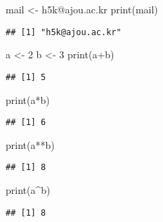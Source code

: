 \documentclass[
]{article}
\newenvironment{Shaded}{\begin{snugshade}}{\end{snugshade}}
\newcommand{\DecValTok}[1]{\textcolor[rgb]{0.00,0.00,0.81}{#1}}
\newcommand{\FunctionTok}[1]{\textcolor[rgb]{0.00,0.00,0.00}{#1}}
\newcommand{\NormalTok}[1]{#1}
\newcommand{\OtherTok}[1]{\textcolor[rgb]{0.56,0.35,0.01}{#1}}
\newcommand{\SpecialCharTok}[1]{\textcolor[rgb]{0.00,0.00,0.00}{#1}}
\newcommand{\StringTok}[1]{\textcolor[rgb]{0.31,0.60,0.02}{#1}}
\begin{document}
\begin{Shaded}
\begin{Highlighting}[]
\NormalTok{mail }\OtherTok{\textless{}{-}} \StringTok{\textquotesingle{}h5k@ajou.ac.kr\textquotesingle{}}
\FunctionTok{print}\NormalTok{(mail)}
\end{Highlighting}
\end{Shaded}

\begin{verbatim}
## [1] "h5k@ajou.ac.kr"
\end{verbatim}

\begin{Shaded}
\begin{Highlighting}[]
\NormalTok{a }\OtherTok{\textless{}{-}} \DecValTok{2}
\NormalTok{b }\OtherTok{\textless{}{-}} \DecValTok{3}
\FunctionTok{print}\NormalTok{(a}\SpecialCharTok{+}\NormalTok{b)}
\end{Highlighting}
\end{Shaded}

\begin{verbatim}
## [1] 5
\end{verbatim}

\begin{Shaded}
\begin{Highlighting}[]
\FunctionTok{print}\NormalTok{(a}\SpecialCharTok{*}\NormalTok{b)}
\end{Highlighting}
\end{Shaded}

\begin{verbatim}
## [1] 6
\end{verbatim}

\begin{Shaded}
\begin{Highlighting}[]
\FunctionTok{print}\NormalTok{(a}\SpecialCharTok{**}\NormalTok{b)}
\end{Highlighting}
\end{Shaded}

\begin{verbatim}
## [1] 8
\end{verbatim}

\begin{Shaded}
\begin{Highlighting}[]
\FunctionTok{print}\NormalTok{(a}\SpecialCharTok{\^{}}\NormalTok{b)}
\end{Highlighting}
\end{Shaded}

\begin{verbatim}
## [1] 8
\end{verbatim}
\end{document}
